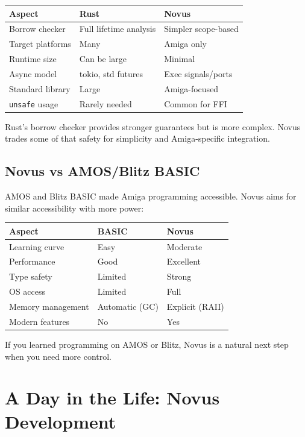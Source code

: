 \begin{center}
\begin{tabular}{lll}
\textbf{Aspect} & \textbf{Rust} & \textbf{Novus} \\
\hline
Borrow checker & Full lifetime analysis & Simpler scope-based \\
Target platforms & Many & Amiga only \\
Runtime size & Can be large & Minimal \\
Async model & tokio, std futures & Exec signals/ports \\
Standard library & Large & Amiga-focused \\
\texttt{unsafe} usage & Rarely needed & Common for FFI \\
\end{tabular}
\end{center}

Rust's borrow checker provides stronger guarantees but is more complex. Novus trades some of that safety for simplicity and Amiga-specific integration.

\subsection{Novus vs AMOS/Blitz BASIC}

AMOS and Blitz BASIC made Amiga programming accessible. Novus aims for similar accessibility with more power:

\begin{center}
\begin{tabular}{lll}
\textbf{Aspect} & \textbf{BASIC} & \textbf{Novus} \\
\hline
Learning curve & Easy & Moderate \\
Performance & Good & Excellent \\
Type safety & Limited & Strong \\
OS access & Limited & Full \\
Memory management & Automatic (GC) & Explicit (RAII) \\
Modern features & No & Yes \\
\end{tabular}
\end{center}

If you learned programming on AMOS or Blitz, Novus is a natural next step when you need more control.

\section{A Day in the Life: Novus Development}
\label{sec:day-in-life}

